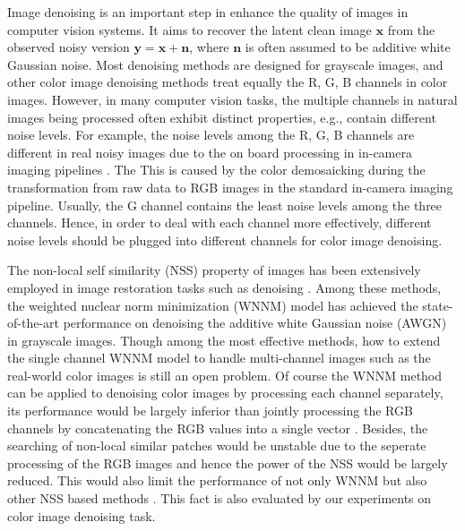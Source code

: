 \documentclass[10pt,twocolumn,letterpaper]{article}
\begin{document}
Image denoising is an important step in enhance the quality of images in computer vision systems. It aims to recover the latent clean image $\mathbf{x}$ from the observed noisy version $\mathbf{y}=\mathbf{x}+\mathbf{n}$, where $\mathbf{n}$ is often assumed to be additive white Gaussian noise. Most denoising methods \cite{ksvd,lssc,ncsr,nlm,bm3d,cbm3d,pgpd,wnnm,mlp,csf,chen2015learning,foe,epll} are designed for grayscale images, and other color image denoising methods \cite{mairal2008sparse} treat equally the R, G, B channels in color images. However, in many computer vision tasks, the multiple channels in natural images being processed often exhibit distinct properties, e.g., contain different noise levels. For example, the noise levels among the R, G, B channels are different in real noisy images due to the on board processing in in-camera imaging pipelines \cite{karaimer_brown_ECCV_2016}. The This is caused by the color demosaicking during the transformation from raw data to RGB images in the standard in-camera imaging pipeline. Usually, the G channel contains the least noise levels among the three channels. Hence, in order to deal with each channel more effectively, different noise levels should be plugged into different channels for color image denoising. 

The non-local self similarity (NSS) property of images has been extensively employed in image restoration tasks such as denoising \cite{ksvd,lssc,ncsr,nlm,bm3d,pgpd,wnnm}. Among these methods, the weighted nuclear norm minimization (WNNM) model has achieved the state-of-the-art performance on denoising the additive white Gaussian noise (AWGN) in grayscale images. Though among the most effective methods, how to extend the single channel WNNM model to handle multi-channel images such as the real-world color images is still an open problem. Of course the WNNM method can be applied to denoising color images by processing each channel separately, its performance would be largely inferior than jointly processing the RGB channels by concatenating the RGB values into a single vector \cite{mairal2008sparse}. Besides, the searching of non-local similar patches would be unstable due to the seperate processing of the RGB images and hence the power of the NSS would be largely reduced. This would also limit the performance of not only WNNM but also other NSS based methods \cite{lssc,ncsr,nlm,bm3d,pgpd}. This fact is also evaluated by our experiments on color image denoising task. 
\end{document}
